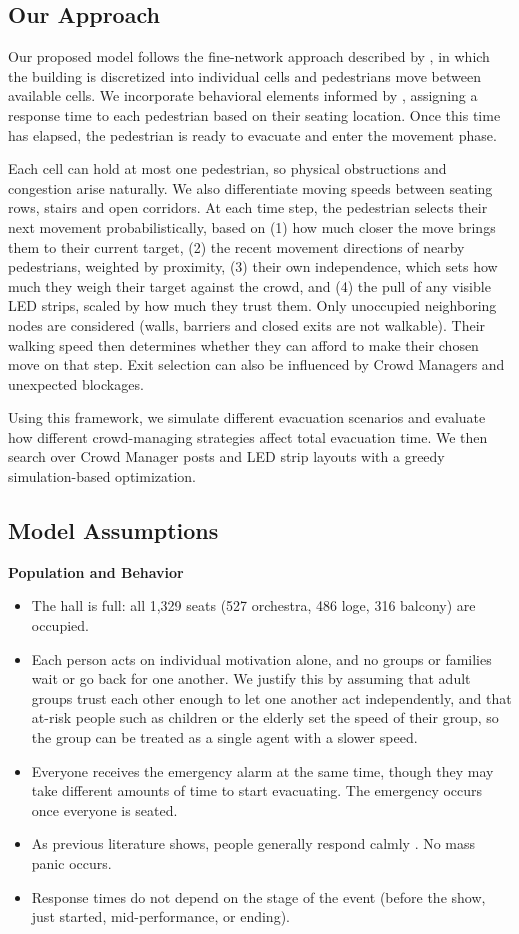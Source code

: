 \documentclass{article}
\begin{document}
\subsection{Our Approach}
Our proposed model follows the fine-network approach described by \cite{burstedde2001}, in which the building is discretized into individual cells and pedestrians move between available cells. We incorporate behavioral elements informed by \cite{galea2017}, assigning a response time to each pedestrian based on their seating location. Once this time has elapsed, the pedestrian is ready to evacuate and enter the movement phase.

Each cell can hold at most one pedestrian, so physical obstructions and congestion arise naturally. We also differentiate moving speeds between seating rows, stairs and open corridors. At each time step, the pedestrian selects their next movement probabilistically, based on (1) how much closer the move brings them to their current target, (2) the recent movement directions of nearby pedestrians, weighted by proximity, (3) their own independence, which sets how much they weigh their target against the crowd, and (4) the pull of any visible LED strips, scaled by how much they trust them. Only unoccupied neighboring nodes are considered (walls, barriers and closed exits are not walkable). Their walking speed then determines whether they can afford to make their chosen move on that step. Exit selection can also be influenced by Crowd Managers and unexpected blockages.

Using this framework, we simulate different evacuation scenarios and evaluate how different crowd-managing strategies affect total evacuation time. We then search over Crowd Manager posts and LED strip layouts with a greedy simulation-based optimization.

\subsection{Model Assumptions}

\textbf{Population and Behavior}
\begin{itemize}
    \item The hall is full: all 1,329 seats (527 orchestra, 486 loge, 316 balcony) are occupied.
    \item Each person acts on individual motivation alone, and no groups or families wait or go back for one another. We justify this by assuming that adult groups trust each other enough to let one another act independently, and that at-risk people such as children or the elderly set the speed of their group, so the group can be treated as a single agent with a slower speed.
    \item Everyone receives the emergency alarm at the same time, though they may take different amounts of time to start evacuating. The emergency occurs once everyone is seated.
    \item As previous literature shows, people generally respond calmly \cite{simeHUMANBEHAVIOURFIRES}. No mass panic occurs.
    \item Response times do not depend on the stage of the event (before the show, just started, mid-performance, or ending).
\end{itemize}
\end{document}
